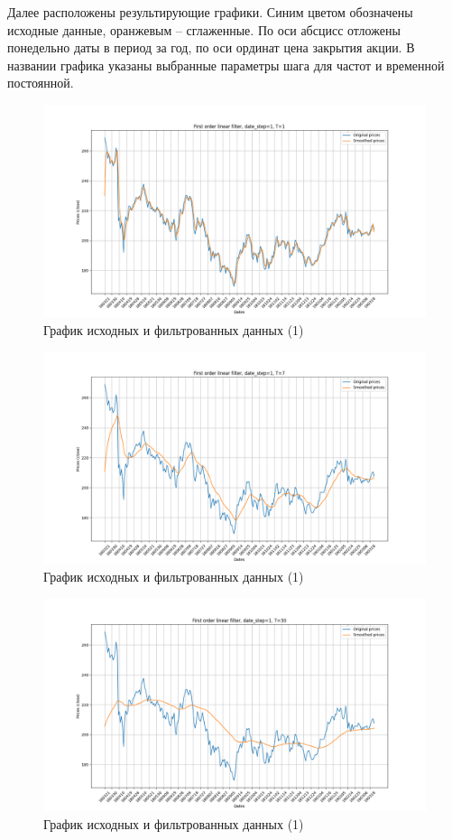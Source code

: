 \documentclass[a4paper, 12pt]{article}
\begin{document}
    Далее расположены результирующие графики. Синим цветом обозначены исходные данные, оранжевым -- сглаженные.
    По оси абсцисс отложены понедельно даты в период за год, по оси ординат цена закрытия акции. В названии графика
    указаны выбранные параметры шага для частот и временной постоянной.
    \begin{figure}[H]
        \centering
        \includegraphics[scale=0.35]{1_1.png}
        \captionsetup{skip=0pt}
        \caption{График исходных и фильтрованных данных (1)}
        \label{fig:11}
    \end{figure}
    \begin{figure}[H]
        \centering
        \includegraphics[scale=0.35]{1_7.png}
        \captionsetup{skip=0pt}
        \caption{График исходных и фильтрованных данных (1)}
        \label{fig:17}
    \end{figure}
    \begin{figure}[H]
        \centering
        \includegraphics[scale=0.35]{1_30.png}
        \captionsetup{skip=0pt}
        \caption{График исходных и фильтрованных данных (1)}
        \label{fig:30}
    \end{figure}
\end{document}
